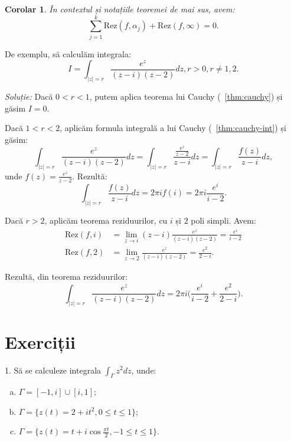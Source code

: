 \documentclass[12pt,a4paper]{article}
\newcommand\ds{\displaystyle}
\theoremstyle{dotless}
\newtheorem{corollary}{Corolar}
\theoremstyle{dotlessdr}
\begin{document}
\begin{corollary}\label{cor:thrm-rez}
  În contextul și notațiile teoremei de mai sus, avem:
  \[
    \sum_{j = 1}^k \mathrm{Rez}(f, \alpha_j) + \mathrm{Rez}(f, \infty) = 0.
  \]
\end{corollary}

\vspace{1cm}

De exemplu, să calculăm integrala:
\[
  I = \int_{|z| = r} \frac{e^z}{(z - i)(z - 2)} dz, r > 0, r \neq 1, 2.
\]

\emph{Soluție:} Dacă $ 0 < r < 1 $, putem aplica teorema lui Cauchy (~\ref{thm:cauchy})
și găsim $ I = 0 $.

Dacă $ 1 < r < 2 $, aplicăm formula integrală a lui Cauchy (~\ref{thm:cauchy-int}) și găsim:
\[
  \int_{|z| = r} \frac{e^z}{(z - i)(z - 2)} dz = %
  \int_{|z| = r} \frac{\frac{e^z}{z - 2}}{z - i} dz = %
  \int_{|z| = r} \frac{f(z)}{z - i} dz,
\]
unde $ f(z) = \frac{e^z}{z - 2} $. Rezultă:
\[
  \int_{|z| = r} \frac{f(z)}{z - i} dz = 2 \pi i f(i) = 2 \pi i \frac{e^i}{i - 2}.
\]

Dacă $ r > 2 $, aplicăm teorema reziduurilor, cu $ i $ și $ 2 $ poli simpli. Avem:
\begin{align*}
  \mathrm{Rez}(f, i) &= \lim_{z \to i} (z - i) \frac{e^z}{(z - i)(z - 2)} = \frac{e^i}{i - 2} \\
  \mathrm{Rez}(f, 2) &= \lim_{z \to 2} \frac{e^z}{(z - i)(z - 2)} = \frac{e^2}{2 - i}.
\end{align*}

Rezultă, din teorema reziduurilor:
\[
  \int_{|z| = r} \frac{e^z}{(z - i)(z - 2)} dz = 2 \pi i \Big( \frac{e^i}{i - 2} + %
  \frac{e^2}{2 - i} \Big).
\]


\section*{Exerciții}

1. Să se calculeze integrala $ \ds\int_\Gamma z^2 dz $, unde:
\begin{enumerate}[(a)]
\item $ \Gamma = [-1, i] \cup [i, 1] $;
\item $ \Gamma = \{ z(t) = 2 + it^2, 0 \leq t \leq 1 \} $;
\item $ \Gamma = \Big\{ z(t) = t + i \cos \frac{\pi t}{2}, -1 \leq t \leq 1 \Big\} $.
\end{enumerate}
\end{document}
